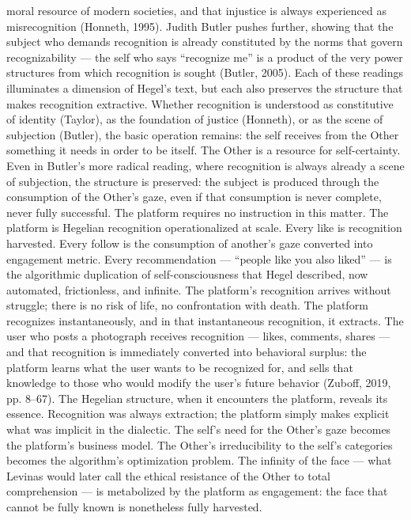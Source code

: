 moral resource of modern societies, and that injustice is always experienced as misrecognition (Honneth, 1995). Judith Butler pushes further, showing that the subject who demands recognition is already constituted by the norms that govern recognizability — the self who says “recognize me” is a product of the very power structures from which recognition is sought (Butler, 2005). Each of these readings illuminates a dimension of Hegel’s text, but each also preserves the structure that makes recognition extractive. Whether recognition is understood as constitutive of identity (Taylor), as the foundation of justice (Honneth), or as the scene of subjection (Butler), the basic operation remains: the self receives from the Other something it needs in order to be itself. The Other is a resource for self-certainty. Even in Butler’s more radical reading, where recognition is always already a scene of subjection, the structure is preserved: the subject is produced through the consumption of the Other’s gaze, even if that consumption is never complete, never fully successful. The platform requires no instruction in this matter. The platform is Hegelian recognition operationalized at scale. Every like is recognition harvested. Every follow is the consumption of another’s gaze converted into engagement metric. Every recommendation — “people like you also liked” — is the algorithmic duplication of self-consciousness that Hegel described, now automated, frictionless, and infinite. The platform’s recognition arrives without struggle; there is no risk of life, no confrontation with death. The platform recognizes instantaneously, and in that instantaneous recognition, it extracts. The user who posts a photograph receives recognition — likes, comments, shares — and that recognition is immediately converted into behavioral surplus: the platform learns what the user wants to be recognized for, and sells that knowledge to those who would modify the user’s future behavior (Zuboff, 2019, pp. 8–67). The Hegelian structure, when it encounters the platform, reveals its essence. Recognition was always extraction; the platform simply makes explicit what was implicit in the dialectic. The self’s need for the Other’s gaze becomes the platform’s business model. The Other’s irreducibility to the self’s categories becomes the algorithm’s optimization problem. The infinity of the face — what Levinas would later call the ethical resistance of the Other to total comprehension — is metabolized by the platform as engagement: the face that cannot be fully known is nonetheless fully harvested.

